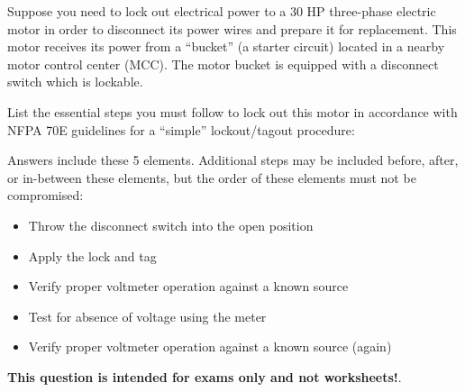 

Suppose you need to lock out electrical power to a 30 HP three-phase electric motor in order to disconnect its power wires and prepare it for replacement.  This motor receives its power from a ``bucket'' (a starter circuit) located in a nearby motor control center (MCC).  The motor bucket is equipped with a disconnect switch which is lockable.

List the essential steps you must follow to lock out this motor in accordance with NFPA 70E guidelines for a ``simple'' lockout/tagout procedure:

\vskip 100pt







Answers  include these 5 elements.  Additional steps may be included before, after, or in-between these elements, but the order of these elements must not be compromised:

\begin{itemize}
\item{} Throw the disconnect switch into the open position
\item{} Apply the lock and tag
\item{} Verify proper voltmeter operation against a known source
\item{} Test for absence of voltage using the meter
\item{} Verify proper voltmeter operation against a known source (again)
\end{itemize}
 






{\bf This question is intended for exams only and not worksheets!}.



